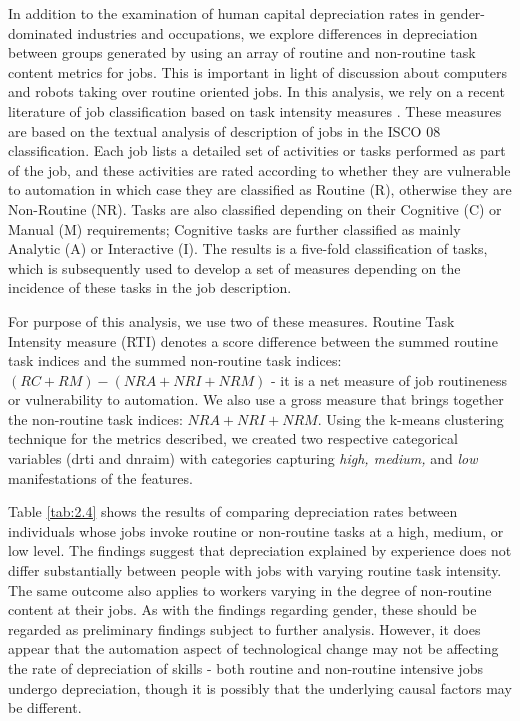 \documentclass[alpha-refs]{wiley-article-02b}
\begin{document}
In addition to the examination of human capital depreciation rates in 
gender-dominated industries and occupations, we explore differences in 
depreciation  between groups generated by using an array of routine and 
non-routine task content metrics for jobs. This is important in light of 
discussion about computers and robots taking over routine oriented jobs. In 
this analysis, we rely on a recent literature of job classification based 
on task intensity measures  \citet{Mihaylov_2019}. These measures are based 
on the textual analysis of description of jobs in the ISCO 08 
classification. Each job lists a detailed set of activities or tasks 
performed as part of the job, and these activities are rated according to 
whether they are vulnerable to automation in which case they are classified 
as Routine (R), otherwise they are Non-Routine (NR). Tasks are also 
classified depending on their Cognitive (C) or Manual (M) requirements; 
Cognitive tasks are further classified as mainly Analytic (A) or 
Interactive (I). The results is a five-fold classification of tasks, which 
is subsequently used to develop a set of measures depending on the 
incidence of these tasks in the job description.

For purpose of this analysis, we use two of these measures. Routine Task 
Intensity measure (RTI) denotes a score difference between the summed 
routine task indices and the summed non-routine task indices: $(RC + RM) - 
(NRA + NRI + NRM)$ - it is a net measure of job routineness or 
vulnerability to automation. We also use a gross measure that brings 
together the non-routine task indices: $NRA + NRI + NRM$. Using the k-means 
clustering technique for the metrics described, we created two respective 
categorical variables (drti and dnraim) with categories capturing 
\textit{high, medium,} and \textit{low} manifestations of the features.

Table \ref{tab:2.4} shows the results of comparing depreciation rates between individuals whose jobs invoke routine or non-routine tasks at a high, medium, or low level. The findings suggest that depreciation explained by experience does not differ substantially between people with jobs with varying routine task intensity. The same outcome also applies to workers varying in the degree of non-routine content at their jobs. As with the findings regarding gender, these should be regarded as preliminary findings subject to further analysis. However, it does appear that the automation aspect of technological change may not be affecting the rate of depreciation of skills - both routine and non-routine intensive jobs undergo depreciation, though it is possibly that the underlying causal factors may be different. 
\end{document}
